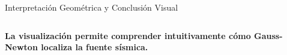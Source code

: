 \begin{frame}{Interpretación Geométrica y Conclusión Visual}
\begin{columns}[T]
    \end{columns}

    \vspace{0.15cm}
    \begin{center}
        \footnotesize
        \textbf{La visualización permite comprender intuitivamente cómo Gauss-Newton localiza la fuente sísmica.}
    \end{center}

\end{frame}